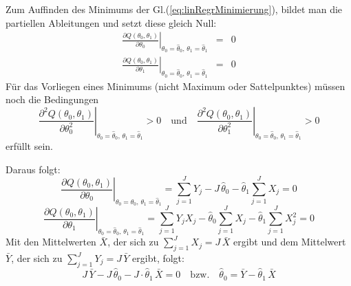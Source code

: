 Zum Auffinden des Minimums der Gl.(\ref{eq:linRegrMinimierung}), bildet man die
partiellen Ableitungen und setzt diese gleich Null:
\begin{equation}
\renewcommand*{\arraystretch}{1.5}
\begin{array}{lcc}
\left. {\frac{\partial Q(\theta _0 ,\theta _1 )}{\partial \theta_0 }}
\right|_{\theta _0 = \hat{\theta}_0 ,\,\theta _1 = \hat{\theta}_1 } & = & 0  \\
\left. {\frac{\partial Q(\theta _0 ,\theta _1 )}{\partial \theta_1 }}
\right|_{\theta _0 = \hat{\theta}_0 ,\,\theta _1 = \hat{\theta}_1 } & = & 0
\end{array}
\label{GleichungssytemKostenfkt}
\end{equation}
Für das Vorliegen eines Minimums (nicht Maximum oder Sattelpunktes) müssen noch
die Bedingungen
\begin{equation}
	\left. {\frac{\partial^2 Q(\theta _0 ,\theta _1 )}{\partial \theta_0^2 }}
\right|_{\theta _0 = \hat{\theta}_0 ,\,\theta _1 = \hat{\theta}_1 } > 0 \quad
\mathrm{und} \quad \left. { \frac{\partial^2 Q(\theta _0 ,\theta _1)}{ \partial \theta_1^2 }}
\right|_{\theta _0 = \hat{\theta}_0 ,\,\theta _1 = \hat{\theta}_1 } > 0
\end{equation}
erfüllt sein.

Daraus folgt:
\[\left. \frac{\partial Q(\theta _0 ,\theta _1 )}{\partial \theta_0 }
\right|_{\theta _0 = \hat{\theta}_0 ,\,\theta _1 = \hat{\theta}_1} = \sum\limits_{j = 1}^J {Y_j - J} \, \hat{\theta}_0 - \hat{\theta}_1 \sum\limits_{j = 1}^J {X_j = 0}
\]
\[
\left. \frac{\partial Q(\theta _0 ,\theta _1 )}{\partial \theta_1 }
\right|_{\theta _0 = \hat{\theta}_0 ,\,\theta _1 = \hat{\theta}_1 }= \sum\limits_{j = 1}^J {Y_j X_j - \hat\theta_0 \sum\limits_{j = 1}^J {X_j - \hat\theta_1 \sum\limits_{j = 1}^J {X_j ^2 = 0} } }
\]
Mit den Mittelwerten $\bar X$, der sich zu $\sum\limits_{j = 1}^J {X_j } = J \, \bar {X}$ ergibt und dem Mittelwert $\bar Y$, der sich zu
$\sum\limits_{j= 1}^J {Y_j } = J \, \bar {Y}$ ergibt, folgt:
\[
J \, \bar {Y} - J \, \hat{\theta}_0 - J \cdot \hat{\theta}_1 \, \bar {X} = 0 \quad
\mathrm{bzw.}\quad \hat{\theta}_0 = \bar {Y} - \hat{\theta}_1 \, \bar {X}
\]

